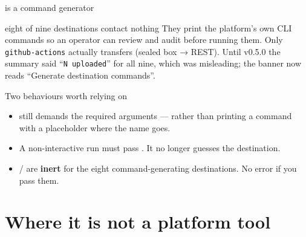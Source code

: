 \documentclass[aspectratio=169,10pt]{beamer}
\begin{document}
\begin{frame}[fragile]{ is a command generator}

  \vspace{0.3em}
  \begin{correction}{eight of nine destinations contact nothing}
    They print the platform's own CLI commands so an operator can review and
    audit before running them. Only \texttt{github-actions} actually transfers
    (sealed box → REST). Until v0.5.0 the summary said ``\texttt{N uploaded}''
    for all nine, which was misleading; the banner now reads ``Generate
    destination commands''.
  \end{correction}
\end{frame}

\begin{frame}[fragile]{Two  behaviours worth relying on}

  \vspace{0.4em}
  \begin{itemize}\footnotesize
    \item {} still demands the required arguments --- rather
          than printing a command with a placeholder where the name goes.
    \item A non-interactive run must pass . It no longer guesses
          the destination.
    \item {} /  are \textbf{inert}
          for the eight command-generating destinations. No error if you pass
          them.
  \end{itemize}
\end{frame}

\section{Where it is not a platform tool}
\end{document}

